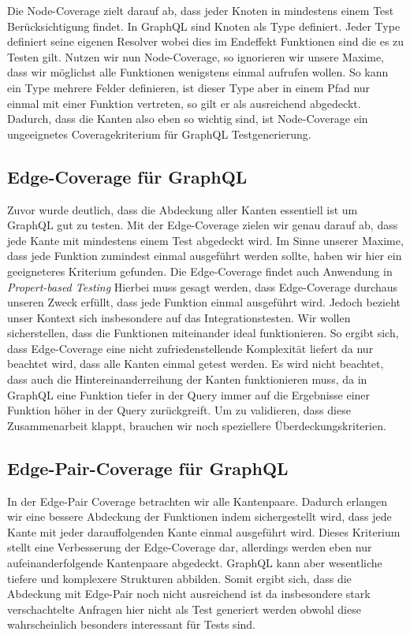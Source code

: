 Die Node-Coverage zielt darauf ab, dass jeder Knoten in mindestens einem Test Berücksichtigung findet.
In GraphQL sind Knoten als Type definiert.
Jeder Type definiert seine eigenen Resolver wobei dies im Endeffekt Funktionen sind die es zu Testen gilt.
Nutzen wir nun Node-Coverage, so ignorieren wir unsere Maxime, dass wir möglichst alle Funktionen wenigstens einmal aufrufen wollen.
So kann ein Type mehrere Felder definieren, ist dieser Type aber in einem Pfad nur einmal mit einer Funktion vertreten, so gilt er als ausreichend abgedeckt.
Dadurch, dass die Kanten also eben so wichtig sind, ist Node-Coverage ein ungeeignetes Coveragekriterium für GraphQL Testgenerierung.

\subsection{Edge-Coverage für GraphQL}

Zuvor wurde deutlich, dass die Abdeckung aller Kanten essentiell ist um GraphQL gut zu testen.
Mit der Edge-Coverage zielen wir genau darauf ab, dass jede Kante mit mindestens einem Test abgedeckt wird.
Im Sinne unserer Maxime, dass jede Funktion zumindest einmal ausgeführt werden sollte, haben wir hier ein geeigneteres
Kriterium gefunden.
Die Edge-Coverage findet auch Anwendung in \textit{Propert-based Testing}\cite[vgl. D-RQ1 ]{property-based-testing}
Hierbei muss gesagt werden, dass Edge-Coverage durchaus unseren Zweck erfüllt, dass jede Funktion einmal ausgeführt wird.
Jedoch bezieht unser Kontext sich insbesondere auf das Integrationstesten.
Wir wollen sicherstellen, dass die Funktionen miteinander ideal funktionieren.
So ergibt sich, dass Edge-Coverage eine nicht zufriedenstellende Komplexität liefert da nur beachtet wird, dass alle Kanten einmal getest werden.
Es wird nicht beachtet, dass auch die Hintereinanderreihung der Kanten funktionieren muss, da in GraphQL eine Funktion tiefer in der Query immer auf die
Ergebnisse einer Funktion höher in der Query zurückgreift.
Um zu validieren, dass diese Zusammenarbeit klappt, brauchen wir noch speziellere Überdeckungskriterien.

\subsection{Edge-Pair-Coverage für GraphQL}

In der Edge-Pair Coverage betrachten wir alle Kantenpaare.
Dadurch erlangen wir eine bessere Abdeckung der Funktionen indem sichergestellt wird, dass jede Kante mit jeder darauffolgenden Kante einmal ausgeführt wird.
Dieses Kriterium stellt eine Verbesserung der Edge-Coverage dar, allerdings werden eben nur aufeinanderfolgende Kantenpaare abgedeckt.
GraphQL kann aber wesentliche tiefere und komplexere Strukturen abbilden.
Somit ergibt sich, dass die Abdeckung mit Edge-Pair noch nicht ausreichend ist da insbesondere stark verschachtelte Anfragen
hier nicht als Test generiert werden obwohl diese wahrscheinlich besonders interessant für Tests sind.

